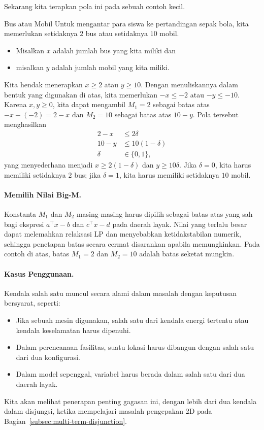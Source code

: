 Sekarang kita terapkan pola ini pada sebuah contoh kecil.

\begin{example}{Bus atau Mobil}{}
Untuk mengantar para siswa ke pertandingan sepak bola, kita memerlukan setidaknya $2$ bus atau setidaknya $10$ mobil.
\begin{itemize}
\item Misalkan $x$ adalah jumlah bus yang kita miliki dan
\item misalkan $y$ adalah jumlah mobil yang kita miliki.
\end{itemize}
Kita hendak menerapkan $x \geq 2$ atau $y \geq 10$. Dengan menuliskannya dalam bentuk yang digunakan di atas, kita memerlukan $-x \leq -2$ atau $-y \leq -10$. Karena $x, y \geq 0$, kita dapat mengambil $M_1 = 2$ sebagai batas atas $-x - (-2) = 2 - x$ dan $M_2 = 10$ sebagai batas atas $10 - y$. Pola tersebut menghasilkan
\begin{equation}
\begin{split}
2 - x &\leq 2\delta\\
10 - y &\leq 10 (1-\delta)\\
\delta &\in \{0,1\},
\end{split}
\end{equation}
yang menyederhana menjadi $x \geq 2(1-\delta)$ dan $y \geq 10\delta$. Jika $\delta = 0$, kita harus memiliki setidaknya $2$ bus; jika $\delta = 1$, kita harus memiliki setidaknya $10$ mobil.
\end{example}

\paragraph{Memilih Nilai Big-M.}
\label{par:choosing-big-M}
Konstanta \(M_1\) dan \(M_2\) masing-masing harus dipilih sebagai batas atas yang sah bagi ekspresi \(a^\top x - b\) dan \(c^\top x - d\) pada daerah layak. Nilai yang terlalu besar dapat melemahkan relaksasi LP dan menyebabkan ketidakstabilan numerik, sehingga penetapan batas secara cermat disarankan apabila memungkinkan. Pada contoh di atas, batas $M_1 = 2$ dan $M_2 = 10$ adalah batas seketat mungkin.

\paragraph{Kasus Penggunaan.}
Kendala salah satu muncul secara alami dalam masalah dengan keputusan bersyarat, seperti:
\begin{itemize}
    \item Jika sebuah mesin digunakan, salah satu dari kendala energi tertentu atau kendala keselamatan harus dipenuhi.
    \item Dalam perencanaan fasilitas, suatu lokasi harus dibangun dengan salah satu dari dua konfigurasi.
    \item Dalam model sepenggal, variabel harus berada dalam salah satu dari dua daerah layak.
\end{itemize}
Kita akan melihat penerapan penting gagasan ini, dengan lebih dari dua kendala dalam disjungsi, ketika mempelajari masalah pengepakan 2D pada Bagian~\ref{subsec:multi-term-disjunction}.
